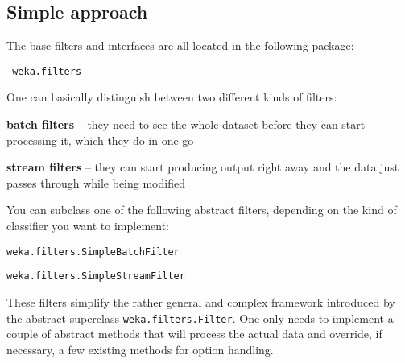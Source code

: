 {\scriptsize }

\newpage
\subsection{Simple approach}
The base filters and interfaces are all located in the following package:
\begin{verbatim}
 weka.filters
\end{verbatim}
One can basically distinguish between two different kinds of filters:
\begin{tight_itemize}
  \item \textbf{batch filters} -- they need to see the whole dataset before they
can start processing it, which they do in one go
  \item \textbf{stream filters} -- they can start producing output right away
and the data just passes through while being modified
\end{tight_itemize}
You can subclass one of the following abstract filters, depending on the kind of
classifier you want to implement:
\begin{tight_itemize}
  \item \texttt{weka.filters.SimpleBatchFilter}
  \item \texttt{weka.filters.SimpleStreamFilter}
\end{tight_itemize}
These filters simplify the rather general and complex framework introduced by
the abstract superclass \texttt{weka.filters.Filter}. One only needs to
implement a couple of abstract methods that will process the actual data and
override, if necessary, a few existing methods for option handling.

